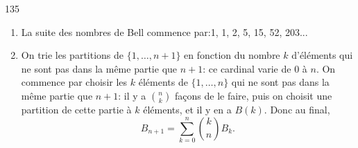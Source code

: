 \begin{Soln}{135}
\begin{enumerate}
\item La suite des nombres de Bell commence par:1, 1, 2, 5, 15, 52, 203...
\item On trie les partitions de $\{1, \dots, n+1\}$ en fonction du nombre $k$ d'éléments qui ne sont pas dans la même partie que $n+1$: ce cardinal varie de $0$ à $n$. On commence par choisir les $k$ éléments de $\{1, \dots,n\}$ qui ne sont pas dans la même partie que $n+1$: il y a ${n \choose k}$ façons de le faire, puis on choisit une partition de cette partie à $k$ éléments, et il y en a $B(k)$. Donc au final,
\[B_{n+1} = \sum_{k=0}^{n} \binom{k}{n}B_k.  \]

\end{enumerate}
\end{Soln}
